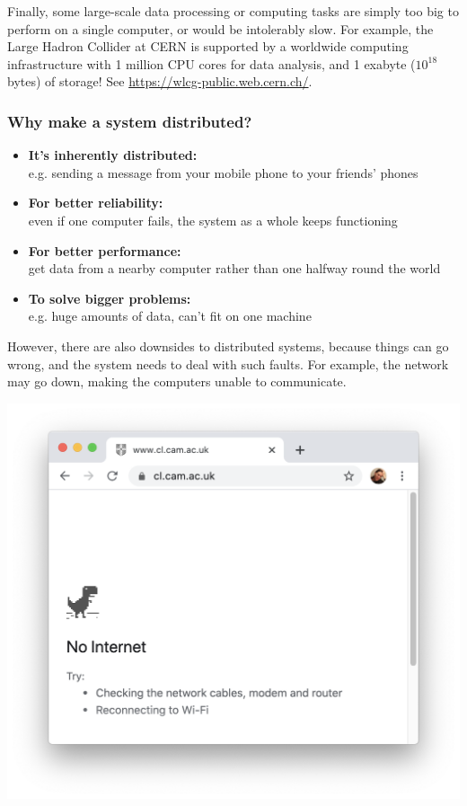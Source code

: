 Finally, some large-scale data processing or computing tasks are simply too big to perform on a single computer, or would be intolerably slow.
For example, the Large Hadron Collider at CERN is supported by a worldwide computing infrastructure with 1 million CPU cores for data analysis, and 1 exabyte ($10^{18}$ bytes) of storage! See \url{https://wlcg-public.web.cern.ch/}.

\begin{frame}
    \label{s:why-distribute}
    \frametitle{Why make a system distributed?}
    \begin{itemize}\pause
        \item \textbf{It's inherently distributed:}\\e.g. sending a message from your mobile phone to your friends' phones\pause
        \item \textbf{For better reliability:}\\even if one computer fails, the system as a whole keeps functioning\pause
        \item \textbf{For better performance:}\\get data from a nearby computer rather than one halfway round the world\pause
        \item \textbf{To solve bigger problems:}\\e.g. huge amounts of data, can't fit on one machine
    \end{itemize}
\end{frame}

However, there are also downsides to distributed systems, because things can go wrong, and the system needs to deal with such faults.
For example, the network may go down, making the computers unable to communicate.

\begin{frame}
    \label{s:no-internet}
    \includegraphics[height=\paperheight]{images/no-internet.png}
\end{frame}


